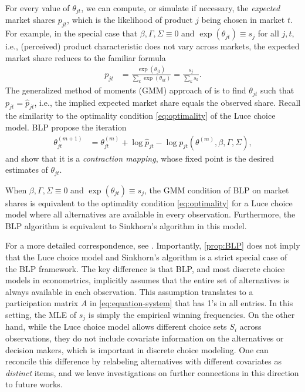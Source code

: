 For every value of $\theta_{jt}$, we can compute, or simulate if necessary, the \emph{expected} market shares $p_{jt}$, which is the likelihood of product $j$ being chosen in market $t$. For example, in the special case that $\beta,\Gamma,\Sigma \equiv 0$ and $\exp(\theta_{jt})\equiv s_{j}$ for all
$j,t$, i.e., (perceived) product characteristic does not vary across
markets, the expected market share reduces to the familiar formula
\begin{align*}
p_{jt} & =\frac{\exp(\theta_{jt})}{\sum_{k}\exp(\theta_{kt})}=\frac{s_{j}}{\sum_{k}s_{k}}.
\end{align*}
The generalized method of moments (GMM) approach of \citet{berry1995automobile} is to find $\theta_{jt}$ such that $p_{jt}=\hat{p}_{jt}$, i.e., the implied expected market share equals the observed share. Recall the similarity to the optimality condition \eqref{eq:optimality} of the Luce choice model. BLP propose the iteration 
\begin{align}
\label{eq:blp}
\theta_{jt}^{(m+1)} & =\theta_{jt}^{(m)}+\log\hat{p}_{jt}-\log p_{jt}(\theta^{(m)},\beta,\Gamma,\Sigma),
\end{align}
 and show that it is a \emph{contraction mapping}, whose fixed point is the desired estimates of $\theta_{jt}$. 
\begin{proposition}
    \label{prop:BLP}
    When $\beta,\Gamma,\Sigma \equiv 0$ and $\exp(\theta_{jt})\equiv s_{j}$, the GMM condition of BLP on market shares is equivalent to the optimality condition \eqref{eq:optimality} for a Luce choice model where all alternatives are available in every observation. Furthermore, the BLP algorithm is equivalent to Sinkhorn's algorithm in this model.
\end{proposition}
For a more detailed correspondence, see \citet{bonnet2022yogurts}. Importantly, \cref{prop:BLP} does not imply that the Luce choice model and Sinkhorn's algorithm is a strict special case of the BLP framework. The key difference is that BLP, and most discrete choice models in econometrics, implicitly assumes that the entire set of alternatives is always available in each observation. This assumption translates to a participation matrix $A$ in \eqref{eq:equation-system} that has 1's in all entries. In this setting, the MLE of $s_j$ is simply the empirical winning frequencies. %
On the other hand, while the Luce choice model allows different choice sets $S_i$ across observations, they do not include covariate information on the alternatives or decision makers, which is important in discrete choice modeling. One can reconcile this difference by relabeling alternatives with different covariates as \emph{distinct} items, and we leave investigations on further connections in this direction to future works.